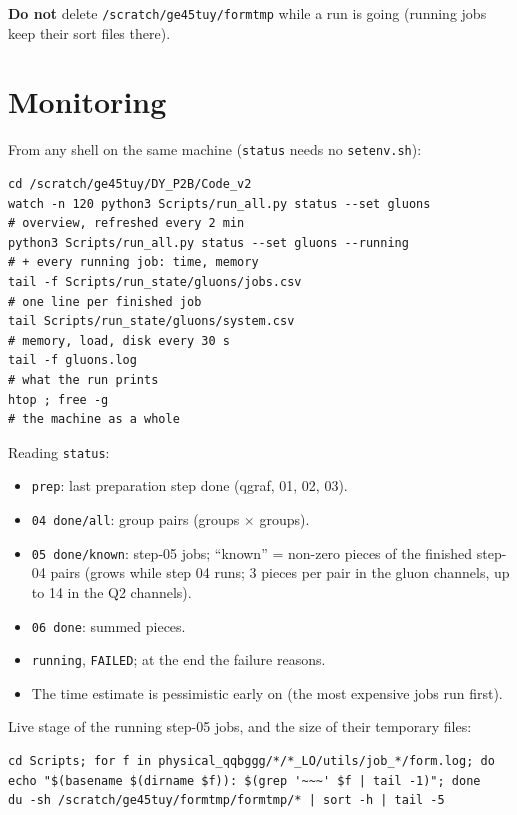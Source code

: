 \documentclass[10pt]{article}
\newcommand{\cmd}[1]{\texttt{#1}}
\begin{document}
\textbf{Do not} delete \cmd{/scratch/ge45tuy/formtmp} while a run is going (running jobs keep their sort files there).

\section{Monitoring}
From any shell on the same machine (\cmd{status} needs no \cmd{setenv.sh}):
\begin{lstlisting}
cd /scratch/ge45tuy/DY_P2B/Code_v2
watch -n 120 python3 Scripts/run_all.py status --set gluons           # overview, refreshed every 2 min
python3 Scripts/run_all.py status --set gluons --running              # + every running job: time, memory
tail -f Scripts/run_state/gluons/jobs.csv                             # one line per finished job
tail Scripts/run_state/gluons/system.csv                              # memory, load, disk every 30 s
tail -f gluons.log                                                    # what the run prints
htop ; free -g                                                        # the machine as a whole
\end{lstlisting}
Reading \cmd{status}:
\begin{itemize}
\item \cmd{prep}: last preparation step done (qgraf, 01, 02, 03).
\item \cmd{04 done/all}: group pairs (groups $\times$ groups).
\item \cmd{05 done/known}: step-05 jobs; ``known'' = non-zero pieces of the finished step-04 pairs (grows while step 04 runs;
  3 pieces per pair in the gluon channels, up to 14 in the Q2 channels).
\item \cmd{06 done}: summed pieces.
\item \cmd{running}, \cmd{FAILED}; at the end the failure reasons.
\item The time estimate is pessimistic early on (the most expensive jobs run first).
\end{itemize}
Live stage of the running step-05 jobs, and the size of their temporary files:
\begin{lstlisting}
cd Scripts; for f in physical_qqbggg/*/*_LO/utils/job_*/form.log; do echo "$(basename $(dirname $f)): $(grep '~~~' $f | tail -1)"; done
du -sh /scratch/ge45tuy/formtmp/formtmp/* | sort -h | tail -5
\end{lstlisting}
\end{document}
